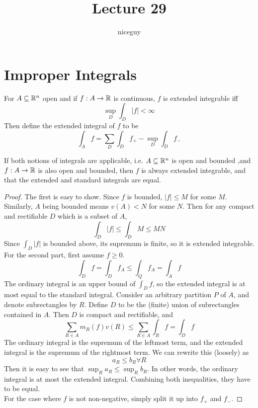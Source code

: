 \documentclass[12pt]{article}
\title{Lecture 29}
\author{niceguy}
\begin{document}
\maketitle

\section{Improper Integrals}

\begin{defn}
    For $A \subseteq \mathbb{R}^n$ open and if $f:A \rightarrow \mathbb{R}$ is continuous, $f$ is extended integrable iff
    $$\sup_D \int_D |f| < \infty$$
    Then define the extended integral of $f$ to be
    $$\int_A f = \sum_D \int_D f_+ - \sup_D \int_D f_-$$
\end{defn}

\begin{thm}
    If both notions of integrals are applicable, i.e. $A \subseteq \mathbb{R}^n$ is open and bounded ,and $f:A \rightarrow \mathbb{R}$ is also open and bounded, then $f$ is always extended integrable, and that the extended and standard integrals are equal.
\end{thm}

\begin{proof}
    The first is easy to show. Since $f$ is bounded, $|f| \leq M$ for some $M$. Similarly, $A$ being bounded means $v(A) < N$ for some $N$. Then for any compact and rectifiable $D$ which is a subset of $A$,
    $$\int_D |f| \leq \int_D M \leq MN$$
    Since $\int_D |f|$ is bounded above, its supremum is finite, so it is extended integrable. \\
    For the second part, first assume $f \geq 0$.
    $$\int_D f = \int_D f_A \leq \int_Q f_A = \int_A f$$
    The ordinary integral is an upper bound of $\int_D f$, so the extended integral is at most equal to the standard integral. Consider an arbitrary partition $P$ of $A$, and denote subrectangles by $R$. Define $D$ to be the (finite) union of subrectangles contained in $A$. Then $D$ is compact and rectifiable, and
    $$\sum_{R \in A} m_R(f)v(R) \leq \sum_{R \in A} \int_R f = \int_D f$$
    The ordinary integral is the supremum of the leftmost term, and the extended integral is the supremum of the rightmost term. We can rewrite this (loosely) as
    $$a_R \leq b_R \forall R$$
    Then it is easy to see that $\sup_R a_R \leq \sup_R b_R$. In other words, the ordinary integral is at most the extended integral. Combining both inequalities, they have to be equal. \\
    For the case where $f$ is not non-negative, simply split it up into $f_+$ and $f_-$.
\end{proof}
\end{document}
